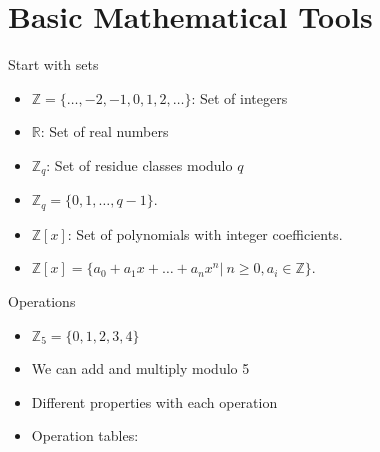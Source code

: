 \documentclass[ %
usenames,dvipsnames,
aspectratio=169,11pt]{beamer}
\newenvironment{stepitemize}{\begin{itemize}[<+->]}{\end{itemize} }
\newcommand{\Z}{\mathbb{Z}}
\newcommand{\R}{\mathbb{R}}
\begin{document}
\section{Basic Mathematical Tools}
\begin{frame}{Start with sets}
    \begin{stepitemize}
    \item $\Z=\{\dots, -2,-1,0,1,2,\dots \}$: Set of integers
    \item $\R$: Set of real numbers
    \item $\Z_q$: Set of residue classes modulo $q$
    \item $\Z_q=\{0,1,\dots,q-1\}$.
    \item $\Z[x]$: Set of polynomials with integer coefficients.
    \item $\Z[x]=\{a_0+a_1x+\dots +a_nx^n| \: n\geq 0, a_i\in \Z\}.$
    \end{stepitemize}
\end{frame}

\begin{frame}{Operations}
\begin{stepitemize}
    \item  $\Z_5=\{0,1,2,3,4\}$
    \item We can add and multiply modulo 5
    \item Different properties with each operation
    \item Operation tables:
\end{stepitemize}
\end{frame}
\end{document}
